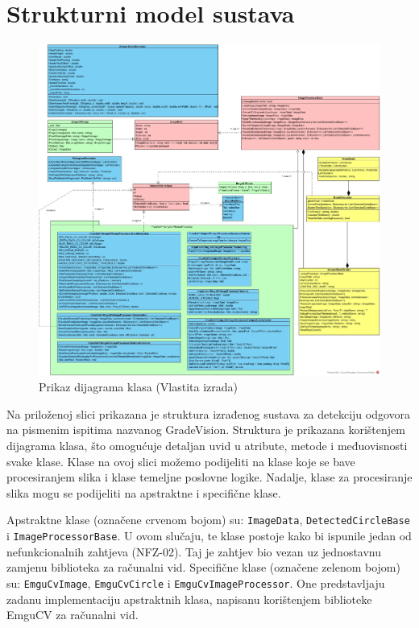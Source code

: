 \documentclass{foi}
\begin{document}
\section{Strukturni model sustava} 


\begin{figure}[H]
    \centering
    \includegraphics[width=1.0\linewidth]{slike/classDiagram.png}
    \caption{Prikaz dijagrama klasa (Vlastita izrada)}
\end{figure}

Na priloženoj slici prikazana je struktura izrađenog sustava za detekciju odgovora na pismenim ispitima nazvanog GradeVision. Struktura je prikazana korištenjem dijagrama klasa, što omogućuje detaljan uvid u atribute, metode i međuovisnosti svake klase. Klase na ovoj slici možemo podijeliti na klase koje se bave procesiranjem slika i klase temeljne poslovne logike. Nadalje, klase za procesiranje slika mogu se podijeliti na apstraktne i specifične klase.

Apstraktne klase (označene crvenom bojom) su: \texttt{ImageData}, \texttt{DetectedCircleBase} i \texttt{ImageProcessorBase}. U ovom slučaju, te klase postoje kako bi ispunile jedan od nefunkcionalnih zahtjeva (NFZ-02). Taj je zahtjev bio vezan uz jednostavnu zamjenu biblioteka za računalni vid.
Specifične klase (označene zelenom bojom) su: \texttt{EmguCvImage}, \texttt{EmguCvCircle} i \texttt{EmguCvImageProcessor}. One predstavljaju zadanu implementaciju apstraktnih klasa, napisanu korištenjem biblioteke EmguCV za računalni vid.
\end{document}
